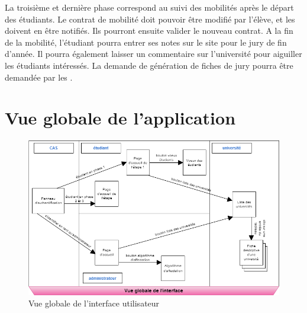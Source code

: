 La troisième et dernière phase correspond au suivi des mobilités après le départ des étudiants. Le contrat de mobilité doit pouvoir être modifié par l'élève, et les \ris doivent en être notifiés. Ils pourront ensuite valider le nouveau contrat. A la fin de la mobilité, l'étudiant pourra entrer ses notes sur le site pour le jury de fin d'année. Il pourra également laisser un commentaire sur l'université pour aiguiller les étudiants intéressés. La demande de génération de fiches de jury pourra être demandée par les \ris.

\section{Vue globale de l'application}

\begin{figure}[H]
    \centering
    \includegraphics[angle=90,scale=0.7]{Annexe/vue_globale.png}
    \caption{Vue globale de l'interface utilisateur}
    \label{fig::vue_glob}
\end{figure}
